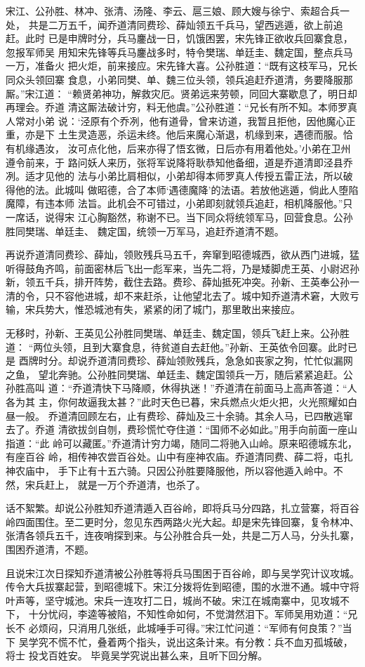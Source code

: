 宋江、公孙胜、林冲、张清、汤隆、李云、扈三娘、顾大嫂与徐宁、索超合兵一处，
共是二万五千，闻乔道清同费珍、薛灿领五千兵马，望西逃遁，欲上前追赶。此时
已是申牌时分，兵马鏖战一日，饥饿困罢，宋先锋正欲收兵回寨食息，忽报军师吴
用知宋先锋等兵马鏖战多时，特令樊瑞、单廷圭、魏定国，整点兵马一万，准备火
把火炬，前来接应。宋先锋大喜。公孙胜道：“既有这枝军马，兄长同众头领回寨
食息，小弟同樊、单、魏三位头领，领兵追赶乔道清，务要降服那厮。”宋江道：
“赖贤弟神功，解救灾厄。贤弟远来劳顿，同回大寨歇息了，明日却再理会。乔道
清这厮法破计穷，料无他虞。”公孙胜道：“兄长有所不知。本师罗真人常对小弟
说：‘泾原有个乔冽，他有道骨，曾来访道，我暂且拒他，因他魔心正重，亦是下
土生灵造恶，杀运未终。他后来魔心渐退，机缘到来，遇德而服。恰有机缘遇汝，
汝可点化他，后来亦得了悟玄微，日后亦有用着他处。’小弟在卫州遵令前来，于
路问妖人来历，张将军说降将耿恭知他备细，道是乔道清即泾县乔冽。适才见他的
法与小弟比肩相似，小弟却得本师罗真人传授五雷正法，所以破得他的法。此城叫
做昭德，合了本师‘遇德魔降’的法语。若放他逃遁，倘此人堕陷魔障，有违本师
法旨。此机会不可错过，小弟即刻就领兵追赶，相机降服他。”只一席话，说得宋
江心胸豁然，称谢不已。当下同众将统领军马，回营食息。公孙胜同樊瑞、单廷圭、
魏定国，统领一万军马，追赶乔道清不题。

再说乔道清同费珍、薛灿，领败残兵马五千，奔窜到昭德城西，欲从西门进城，猛
听得鼓角齐鸣，前面密林后飞出一彪军来，当先二将，乃是矮脚虎王英、小尉迟孙
新，领五千兵，排开阵势，截住去路。费珍、薛灿抵死冲突。孙新、王英奉公孙一
清的令，只不容他进城，却不来赶杀，让他望北去了。城中知乔道清术窘，大败亏
输，宋兵势大，惟恐城池有失，紧紧的闭了城门，那里敢出来接应。

无移时，孙新、王英见公孙胜同樊瑞、单廷圭、魏定国，领兵飞赶上来。公孙胜道：
“两位头领，且到大寨食息，待贫道自去赶他。”孙新、王英依令回寨。此时已是
酉牌时分。却说乔道清同费珍、薛灿领败残兵，急急如丧家之狗，忙忙似漏网之鱼，
望北奔驰。公孙胜同樊瑞、单廷圭、魏定国领兵一万，随后紧紧追赶。公孙胜高叫
道：“乔道清快下马降顺，休得执迷！”乔道清在前面马上高声答道：“人各为其
主，你何故逼我太甚？”此时天色已暮，宋兵燃点火炬火把，火光照耀如白昼一般。
乔道清回顾左右，止有费珍、薛灿及三十余骑。其余人马，已四散逃窜去了。乔道
清欲拔剑自刎，费珍慌忙夺住道：“国师不必如此。”用手向前面一座山指道：“此
岭可以藏匿。”乔道清计穷力竭，随同二将驰入山岭。原来昭德城东北，有座百谷
岭，相传神农尝百谷处。山中有座神农庙。乔道清同费、薛二将，屯扎神农庙中，
手下止有十五六骑。只因公孙胜要降服他，所以容他遁入岭中。不然，宋兵赶上，
就是一万个乔道清，也杀了。

话不絮繁。却说公孙胜知乔道清遁入百谷岭，即将兵马分四路，扎立营寨，将百谷
岭四面围住。至二更时分，忽见东西两路火光大起。却是宋先锋回寨，复令林冲、
张清各领兵五千，连夜哨探到来。与公孙胜合兵一处，共是二万人马，分头扎寨，
围困乔道清，不题。

且说宋江次日探知乔道清被公孙胜等将兵马围困于百谷岭，即与吴学究计议攻城。
传令大兵拔寨起营，到昭德城下。宋江分拨将佐到昭德，围的水泄不通。城中守将
叶声等，坚守城池。宋兵一连攻打二日，城尚不破。宋江在城南寨中，见攻城不下，
十分忧闷，李逵等被陷，不知性命如何，不觉潸然泪下。军师吴用劝道：“兄长不
必烦闷，只消用几张纸，此城唾手可得。”宋江忙问道：“军师有何良策？”当下
吴学究不慌不忙，叠着两个指头，说出这条计来。有分教：兵不血刃孤城破，将士
投戈百姓安。
毕竟吴学究说出甚么来，且听下回分解。